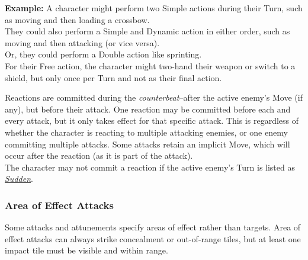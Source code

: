 \documentclass[12pt]{article}
\newcommand{\reftoit}[1]{\hyperlink{#1}{\emph{#1}}}
\begin{document}
\begin{multicols*}{2}
\begin{tcolorbox}
\textbf{Example:} A character might perform two Simple actions during their Turn, such as moving and then loading a crossbow.\\
They could also perform a Simple and Dynamic action in either order, such as moving and then attacking (or vice versa).\\
Or, they could perform a Double action like sprinting.\\
For their Free action, the character might two-hand their weapon or switch to a shield, but only once per Turn and not as their final action.
\end{tcolorbox}

Reactions are committed during the \emph{counterbeat}--after the active enemy’s Move (if any), but before their attack. One reaction may be committed before each and every attack, but it only takes effect for that specific attack. This is regardless of whether the character is reacting to multiple attacking enemies, or one enemy committing multiple attacks. Some attacks retain an implicit Move, which will occur after the reaction (as it is part of the attack).\\
The character may not commit a reaction if the active enemy’s Turn is listed as \reftoit{Sudden}.

\vspace*{\fill}
\columnbreak

\subsubsection{Area of Effect Attacks}
Some attacks and attunements specify areas of effect rather than targets. Area of effect attacks can always strike concealment or out-of-range tiles, but at least one impact tile must be visible and within range.\\


\end{multicols*}
\end{document}
